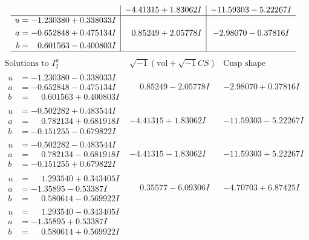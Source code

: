 \documentclass[1p]{elsarticle_modified}
\theoremstyle{definition}
\newcommand{\I}{\sqrt{-1}}
\begin{document}
$$\begin{array}{c|c|c}
 & -4.41315 + 1.83062 I & -11.59303 - 5.22267 I \\ \hline\begin{aligned}
u &= -1.230380 + 0.338033 I \\
a &= -0.652848 + 0.475134 I \\
b &= \phantom{-}0.601563 - 0.400803 I\end{aligned}
 & \phantom{-}0.85249 + 2.05778 I & -2.98070 - 0.37816 I\\
 \hline 
 \end{array}$$\newpage$$\begin{array}{c|c|c}  
\text{Solutions to }I^u_{2}& \I (\text{vol} + \sqrt{-1}CS) & \text{Cusp shape}\\
 \hline 
\begin{aligned}
u &= -1.230380 - 0.338033 I \\
a &= -0.652848 - 0.475134 I \\
b &= \phantom{-}0.601563 + 0.400803 I\end{aligned}
 & \phantom{-}0.85249 - 2.05778 I & -2.98070 + 0.37816 I \\ \hline\begin{aligned}
u &= -0.502282 + 0.483544 I \\
a &= \phantom{-}0.782134 + 0.681918 I \\
b &= -0.151255 - 0.679822 I\end{aligned}
 & -4.41315 + 1.83062 I & -11.59303 - 5.22267 I \\ \hline\begin{aligned}
u &= -0.502282 - 0.483544 I \\
a &= \phantom{-}0.782134 - 0.681918 I \\
b &= -0.151255 + 0.679822 I\end{aligned}
 & -4.41315 - 1.83062 I & -11.59303 + 5.22267 I \\ \hline\begin{aligned}
u &= \phantom{-}1.293540 + 0.343405 I \\
a &= -1.35895 - 0.53387 I \\
b &= \phantom{-}0.580614 - 0.569922 I\end{aligned}
 & \phantom{-}0.35577 - 6.09306 I & -4.70703 + 6.87425 I \\ \hline\begin{aligned}
u &= \phantom{-}1.293540 - 0.343405 I \\
a &= -1.35895 + 0.53387 I \\
b &= \phantom{-}0.580614 + 0.569922 I\end{aligned}

\end{array}$$
\end{document}
